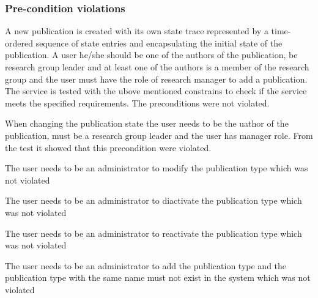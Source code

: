 \subsubsection{Pre-condition violations}
A new publication is created with its own state trace represented by a time-ordered sequence of state entries and encapsulating the initial state of the publication. A user he/she should be one of the authors of the publication, be research group leader and at least one of the authors is a member of the research group and the user must have the role of research manager to add a publication.
The service is tested with the ubove mentioned constrains to check if the service meets the specified requirements. The preconditions were not violated.

When changing the publication state the user needs to be the uathor of the publication, must be a research group leader and the user has manager role. From the test it showed that this precondition were violated.

The user needs to be an administrator to modify the publication type which was not violated

The user needs to be an administrator to diactivate the publication type which was not violated

The user needs to be an administrator to reactivate the publication type which was not violated

The user needs to be an administrator to add the publication type and the publication type with the same name must not exist in the system which was not violated